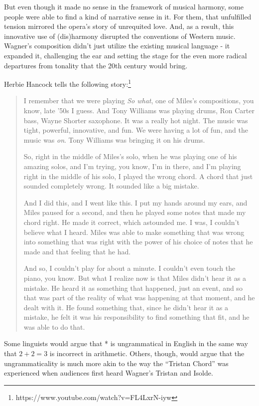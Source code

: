 But even though it made no sense in the framework of musical harmony, some people were able to find a kind of narrative sense in it. For them, that unfulfilled tension mirrored the opera's story of unrequited love. And, as a result, this innovative use of (dis)harmony disrupted the conventions of Western music. Wagner's composition didn't just utilize the existing musical language - it expanded it, challenging the ear and setting the stage for the even more radical departures from tonality that the 20th century would bring.

Herbie Hancock tells the following story:\footnote{https://www.youtube.com/watch?v=FL4LxrN-iyw}

\begin{quote}
    I remember that we were playing \textit{So what}, one of Miles's compositions, you know, late '50s I guess. And Tony Williams was playing drums, Ron Carter bass, Wayne Shorter saxophone. It was a really hot night. The music was tight, powerful, innovative, and fun. We were having a lot of fun, and the music was \textit{on}. Tony Williams was bringing it on his drums.
    
    So, right in the middle of Miles's solo, when he was playing one of his amazing solos, and I'm trying, you know, I'm in there, and I'm playing right in the middle of his solo, I played the wrong chord. A chord that just sounded completely wrong. It sounded like a big mistake. 
    
    And I did this, and I went like this. I put my hands around my ears, and Miles paused for a second, and then he played some notes that made my chord right. He made it correct, which astounded me. I was, I couldn't believe what I heard. Miles was able to make something that was wrong into something that was right with the power of his choice of notes that he made and that feeling that he had. 
    
    And so, I couldn't play for about a minute. I couldn't even touch the piano, you know. But what I realize now is that Miles didn't hear it as a mistake. He heard it as something that happened, just an event, and so that was part of the reality of what was happening at that moment, and he dealt with it. He found something that, since he didn't hear it as a mistake, he felt it was his responsibility to find something that fit, and he was able to do that.
\end{quote}

Some linguists would argue that * is ungrammatical in English in the same way that $2+2=3$ is incorrect in arithmetic. Others, though, would argue that the ungrammaticality is much more akin to the way the ``Tristan Chord'' was experienced when audiences first heard Wagner's Tristan and Isolde.

